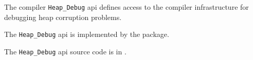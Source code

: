 
The compiler {\tt Heap\_Debug} api defines access to the compiler infrastructure 
for debugging heap corruption problems. 

The {\tt Heap\_Debug} api is implemented by the  package. 

The {\tt Heap\_Debug} api source code is in . 






